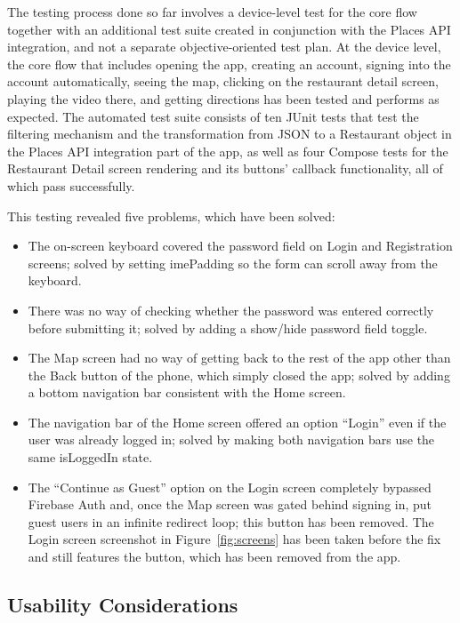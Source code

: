\documentclass[12pt, a4paper]{article}
\begin{document}
The testing process done so far involves a device-level test for the core flow together with an additional test suite created in conjunction with the Places API integration, and not a separate objective-oriented test plan. At the device level, the core flow that includes opening the app, creating an account, signing into the account automatically, seeing the map, clicking on the restaurant detail screen, playing the video there, and getting directions has been tested and performs as expected. The automated test suite consists of ten JUnit tests that test the filtering mechanism and the transformation from JSON to a Restaurant object in the Places API integration part of the app, as well as four Compose tests for the Restaurant Detail screen rendering and its buttons' callback functionality, all of which pass successfully.

This testing revealed five problems, which have been solved:
\begin{itemize}
    \item The on-screen keyboard covered the password field on Login and Registration screens; solved by setting imePadding so the form can scroll away from the keyboard.
    \item There was no way of checking whether the password was entered correctly before submitting it; solved by adding a show/hide password field toggle.
    \item The Map screen had no way of getting back to the rest of the app other than the Back button of the phone, which simply closed the app; solved by adding a bottom navigation bar consistent with the Home screen.
    \item The navigation bar of the Home screen offered an option ``Login'' even if the user was already logged in; solved by making both navigation bars use the same isLoggedIn state.
    \item The ``Continue as Guest'' option on the Login screen completely bypassed Firebase Auth and, once the Map screen was gated behind signing in, put guest users in an infinite redirect loop; this button has been removed. The Login screen screenshot in Figure~\ref{fig:screens} has been taken before the fix and still features the button, which has been removed from the app.
\end{itemize}

\subsection{Usability Considerations}
\end{document}
